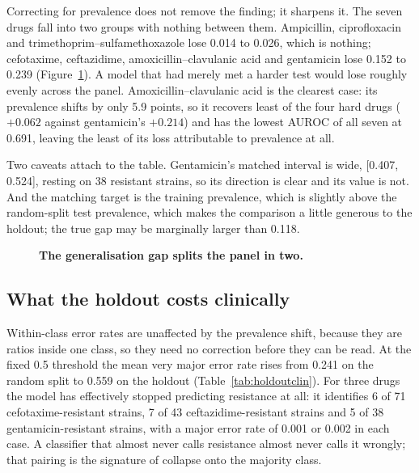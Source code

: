 Correcting for prevalence does not remove the finding; it sharpens it. The seven drugs fall into
two groups with nothing between them. Ampicillin, ciprofloxacin and
trimethoprim--sulfamethoxazole lose 0.014 to 0.026, which is nothing; cefotaxime, ceftazidime,
amoxicillin--clavulanic acid and gentamicin lose 0.152 to 0.239 (Figure~\ref{fig:twogroups}). A
model that had merely met a harder test would lose roughly evenly across the panel.
Amoxicillin--clavulanic acid is the clearest case: its prevalence shifts by only 5.9 points, so it
recovers least of the four hard drugs ($+0.062$ against gentamicin's $+0.214$) and has the lowest
AUROC of all seven at 0.691, leaving the least of its loss attributable to prevalence at all.

Two caveats attach to the table. Gentamicin's matched interval is wide, [0.407, 0.524], resting on
38 resistant strains, so its direction is clear and its value is not. And the matching target is the
training prevalence, which is slightly above the random-split test prevalence, which makes the
comparison a little generous to the holdout; the true gap may be marginally larger than 0.118.

\begin{figure}[t]\centering
{}
\caption{\textbf{The generalisation gap splits the panel in two.} }\label{fig:twogroups}
\end{figure}

\subsection*{What the holdout costs clinically}

Within-class error rates are unaffected by the prevalence shift, because they are ratios inside one
class, so they need no correction before they can be read. At the fixed 0.5 threshold the mean very
major error rate rises from 0.241 on the random split to 0.559 on the holdout
(Table~\ref{tab:holdoutclin}). For three drugs the model has effectively stopped predicting
resistance at all: it identifies 6 of 71 cefotaxime-resistant strains, 7 of 43
ceftazidime-resistant strains and 5 of 38 gentamicin-resistant strains, with a major error rate of
0.001 or 0.002 in each case. A classifier that almost never calls resistance almost never calls it
wrongly; that pairing is the signature of collapse onto the majority class.

